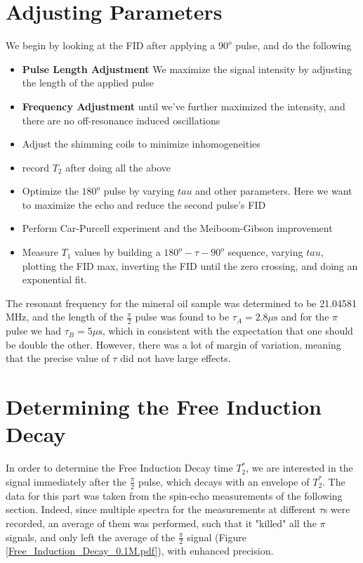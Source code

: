 \documentclass[12pt]{article}
\begin{document}
\section{Adjusting Parameters}

We begin by looking at the FID after applying a $90^o$ pulse, and do the following

\begin{itemize}
    \item \textbf{Pulse Length Adjustment} We maximize the signal intensity by adjusting the length of the applied pulse
    \item \textbf{Frequency Adjustment} until we've further maximized the intensity, and there are no off-resonance induced oscillations
    \item Adjust the shimming coils to minimize inhomogeneities
    \item record $T_2$ after doing all the above
    \item Optimize the $180^o$ pulse by varying $tau$ and other parameters. Here we want to maximize the echo and reduce the second pulse's FID
    \item Perform Car-Purcell experiment and the Meiboom-Gibson improvement
    \item Measure $T_1$ values by building a $180^o - \tau - 90^o$ sequence, varying $tau$, plotting the FID max, inverting the FID until the zero crossing, and doing an exponential fit.

\end{itemize}

The resonant frequency for the mineral oil sample was determined to be 21.04581 MHz, and the length of the $\frac{\pi}{2}$ pulse was found to be $\tau_{A} = 2.8 \text{$\mu$s}$ and for the $\pi$ pulse we had $\tau_{B} = 5 \text{$\mu$s}$, which in consistent with the expectation that one should be double the other. However, there was a lot of margin of variation, meaning that the precise value of $\tau$ did not have large effects.

\section{Determining the Free Induction Decay}
In order to determine the Free Induction Decay time $T_2^*$, we are interested in the signal immediately after the $\frac{\pi}{2}$ pulse, which decays with an envelope of $T_2^*$. The data for this part was taken from the spin-echo measurements of the following section. Indeed, since multiple spectra for the measurements at different $\tau$s were recorded, an average of them was performed, such that it "killed" all the $\pi$ signals, and only left the average of the $\frac{\pi}{2}$ signal (Figure \ref{Free_Induction_Decay_0.1M.pdf}), with enhanced precision.
\end{document}
